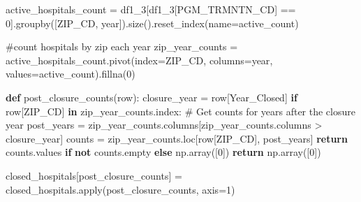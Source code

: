 \documentclass[
  letterpaper,
  DIV=11,
  numbers=noendperiod]{scrartcl}
\newenvironment{Shaded}{\begin{snugshade}}{\end{snugshade}}
\newcommand{\BuiltInTok}[1]{\textcolor[rgb]{0.00,0.23,0.31}{#1}}
\newcommand{\CommentTok}[1]{\textcolor[rgb]{0.37,0.37,0.37}{#1}}
\newcommand{\ControlFlowTok}[1]{\textcolor[rgb]{0.00,0.23,0.31}{\textbf{#1}}}
\newcommand{\DecValTok}[1]{\textcolor[rgb]{0.68,0.00,0.00}{#1}}
\newcommand{\KeywordTok}[1]{\textcolor[rgb]{0.00,0.23,0.31}{\textbf{#1}}}
\newcommand{\NormalTok}[1]{\textcolor[rgb]{0.00,0.23,0.31}{#1}}
\newcommand{\OperatorTok}[1]{\textcolor[rgb]{0.37,0.37,0.37}{#1}}
\newcommand{\StringTok}[1]{\textcolor[rgb]{0.13,0.47,0.30}{#1}}
\begin{document}
\begin{Shaded}
\begin{Highlighting}[]
\NormalTok{active\_hospitals\_count }\OperatorTok{=}\NormalTok{ df1\_3[df1\_3[}\StringTok{\textquotesingle{}PGM\_TRMNTN\_CD\textquotesingle{}}\NormalTok{] }\OperatorTok{==} \DecValTok{0}\NormalTok{].groupby([}\StringTok{\textquotesingle{}ZIP\_CD\textquotesingle{}}\NormalTok{, }\StringTok{\textquotesingle{}year\textquotesingle{}}\NormalTok{]).size().reset\_index(name}\OperatorTok{=}\StringTok{\textquotesingle{}active\_count\textquotesingle{}}\NormalTok{)}

\CommentTok{\#count hospitals by zip each year}
\NormalTok{zip\_year\_counts }\OperatorTok{=}\NormalTok{ active\_hospitals\_count.pivot(index}\OperatorTok{=}\StringTok{\textquotesingle{}ZIP\_CD\textquotesingle{}}\NormalTok{, columns}\OperatorTok{=}\StringTok{\textquotesingle{}year\textquotesingle{}}\NormalTok{, values}\OperatorTok{=}\StringTok{\textquotesingle{}active\_count\textquotesingle{}}\NormalTok{).fillna(}\DecValTok{0}\NormalTok{)}

\KeywordTok{def}\NormalTok{ post\_closure\_counts(row):}
\NormalTok{    closure\_year }\OperatorTok{=}\NormalTok{ row[}\StringTok{\textquotesingle{}Year\_Closed\textquotesingle{}}\NormalTok{]}
    \ControlFlowTok{if}\NormalTok{ row[}\StringTok{\textquotesingle{}ZIP\_CD\textquotesingle{}}\NormalTok{] }\KeywordTok{in}\NormalTok{ zip\_year\_counts.index:}
        \CommentTok{\# Get counts for years after the closure year}
\NormalTok{        post\_years }\OperatorTok{=}\NormalTok{ zip\_year\_counts.columns[zip\_year\_counts.columns }\OperatorTok{\textgreater{}}\NormalTok{ closure\_year]}
\NormalTok{        counts }\OperatorTok{=}\NormalTok{ zip\_year\_counts.loc[row[}\StringTok{\textquotesingle{}ZIP\_CD\textquotesingle{}}\NormalTok{], post\_years]}
        \ControlFlowTok{return}\NormalTok{ counts.values }\ControlFlowTok{if} \KeywordTok{not}\NormalTok{ counts.empty }\ControlFlowTok{else}\NormalTok{ np.array([}\DecValTok{0}\NormalTok{])}
    \ControlFlowTok{return}\NormalTok{ np.array([}\DecValTok{0}\NormalTok{])}

\NormalTok{closed\_hospitals[}\StringTok{\textquotesingle{}post\_closure\_counts\textquotesingle{}}\NormalTok{] }\OperatorTok{=}\NormalTok{ closed\_hospitals.}\BuiltInTok{apply}\NormalTok{(post\_closure\_counts, axis}\OperatorTok{=}\DecValTok{1}\NormalTok{)}



\end{Highlighting}
\end{Shaded}
\end{document}
